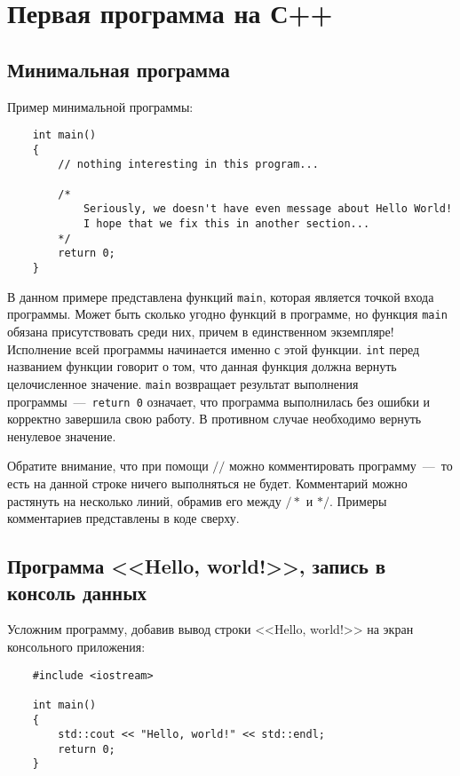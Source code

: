 \section{Первая программа на С++}
\subsection{Минимальная программа}

Пример минимальной программы:

\lstset{style=CPlusPlus}
\begin{lstlisting}
    int main()
    {
        // nothing interesting in this program...

        /*
            Seriously, we doesn't have even message about Hello World!
            I hope that we fix this in another section...
        */
        return 0;
    }
\end{lstlisting}

В данном примере представлена функций \lstinline|main|, которая является точкой входа программы. Может быть сколько угодно функций в программе, но функция \lstinline|main| обязана присутствовать среди них, причем в единственном экземпляре! Исполнение всей программы начинается именно с этой функции. \lstinline|int| перед названием функции говорит о том, что данная функция должна вернуть целочисленное значение. \lstinline|main| возвращает результат выполнения программы~---~\lstinline|return 0| означает, что программа выполнилась без ошибки и корректно завершила свою работу. В противном случае необходимо вернуть ненулевое значение.

Обратите внимание, что при помощи $//$ можно комментировать программу~---~то есть на данной строке ничего выполняться не будет. Комментарий можно растянуть на несколько линий, обрамив его между $/*$ и $*/$. Примеры комментариев представлены в коде сверху.

\subsection{Программа <<Hello, world!>>, запись в консоль данных}

Усложним программу, добавив вывод строки <<Hello, world!>> на экран консольного приложения:

\begin{lstlisting}
    #include <iostream>

    int main()
    {
        std::cout << "Hello, world!" << std::endl;
        return 0;
    }
\end{lstlisting}

